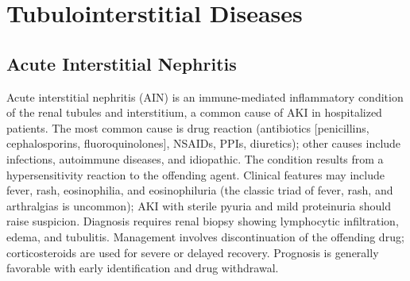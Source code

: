 \section{Tubulointerstitial Diseases}








\label{sec:Tubulointerstitial Diseases}

\subsection{Acute Interstitial Nephritis}
\label{sec:Acute Interstitial Nephritis}
Acute interstitial nephritis (AIN) is an immune-mediated inflammatory condition of the renal tubules and interstitium, a common cause of AKI in hospitalized patients. The most common cause is drug reaction (antibiotics [penicillins, cephalosporins, fluoroquinolones], NSAIDs, PPIs, diuretics); other causes include infections, autoimmune diseases, and idiopathic. The condition results from a hypersensitivity reaction to the offending agent. Clinical features may include fever, rash, eosinophilia, and eosinophiluria (the classic triad of fever, rash, and arthralgias is uncommon); AKI with sterile pyuria and mild proteinuria should raise suspicion. Diagnosis requires renal biopsy showing lymphocytic infiltration, edema, and tubulitis. Management involves discontinuation of the offending drug; corticosteroids are used for severe or delayed recovery. Prognosis is generally favorable with early identification and drug withdrawal.

